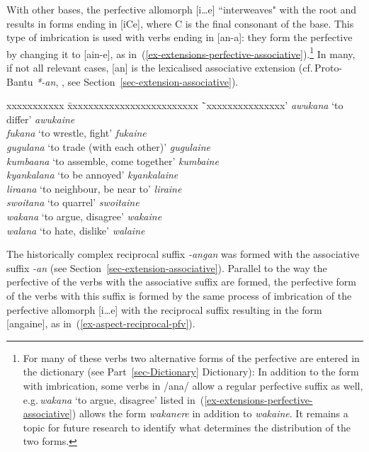 With other bases, the perfective allomorph [i…e] ``interweaves" with the root and results in forms ending in [iCe], where C is the final consonant of the base. 
This type of imbrication is used with verbs ending in [an-a]: they form the perfective by changing it to [ain-e], as in~(\ref{ex-extensions-perfective-associative}).\footnote{For many of these verbs two alternative forms of the perfective are entered in the dictionary (see Part~\ref{sec-Dictionary} Dictionary): In addition to the form with imbrication, some verbs in /ana/ allow a regular perfective suffix as well, e.g.\,\textit{wakana} `to argue, disagree' listed in~(\ref{ex-extensions-perfective-associative}) allows the form \textit{wakanere} in addition to \textit{wakaine}. 
It remains a topic for future research to identify what determines the distribution of the two forms.}
In many, if not all relevant cases, [an] is the lexicalised associative extension (cf.\,Proto-Bantu \textit{*-an}, \citealt[173]{Schadebergetal2019Bantu}, see Section~\ref{sec-extension-associative}). 

\ea \label{ex-extensions-perfective-associative}
\begin{tabbing}
xxxxxxxxxxx \= xxxxxxxxxxxxxxxxxxxxxxxxx \=`xxxxxxxxxxxxxxx'\kill
\textit{awukana} \>`to differ' \>\textit{awukaine}\\
\textit{fukana} \>`to wrestle, fight'   \>   \textit{fukaine}\\
\textit{gugulana} \>`to trade (with each other)'   \>   \textit{gugulaine}\\
\textit{kumbaana} \>`to assemble, come together'   \>   \textit{kumbaine}\\
\textit{kyankalana} \>`to be annoyed'   \>   \textit{kyankalaine}\\
\textit{liraana} \>`to neighbour, be near to'   \>   \textit{liraine}\\
\textit{swoitana} \>`to quarrel'   \>   \textit{swoitaine}\\
\textit{wakana} \>`to argue, disagree'   \>   \textit{wakaine}\\
\textit{walana} \>`to hate, dislike'   \> \textit{walaine}
\end{tabbing}
\z

The historically complex reciprocal suffix \textit{-angan} was formed with the associative suffix \textit{-an} (see Section~\ref{sec-extension-associative}). 
Parallel to the way the perfective of the verbs with the associative suffix are formed, the perfective form of the verbs with this suffix is formed by the same process of imbrication of the perfective allomorph [i…e] with the reciprocal suffix resulting in the form [angaine], as in~(\ref{ex-aspect-reciprocal-pfv}).  

